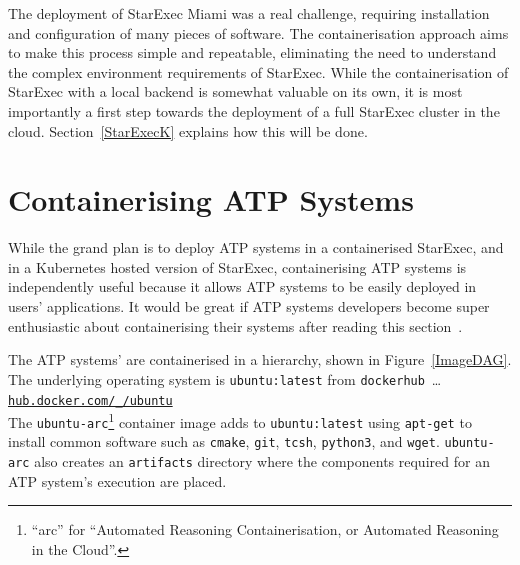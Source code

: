 \documentclass{easychair}
\newcommand{\dav}[1]{{\color{red}{David: {#1}}}}
\begin{document}
The deployment of StarExec Miami was a real challenge, requiring installation and configuration 
of many pieces of software.
The containerisation approach aims to make this process simple and repeatable, eliminating the 
need to understand the complex environment requirements of StarExec. 
While the containerisation of StarExec with a local backend is somewhat valuable on its own,
it is most importantly a first step towards the deployment of a full StarExec cluster in the cloud.
Section~\ref{StarExecK} explains how this will be done.


\section{Containerising ATP Systems}
\label{ContainerisingATPSystems}

While the grand plan is to deploy ATP systems in a containerised StarExec, and in a Kubernetes 
hosted version of StarExec, containerising ATP systems is independently useful because it allows 
ATP systems to be easily deployed in users' applications.
It would be great if ATP systems developers become super enthusiastic about containerising their 
systems after reading this section~\smiley.

The ATP systems' are containerised in a hierarchy, shown in Figure~\ref{ImageDAG}.
The underlying operating system is {\tt ubuntu:latest} from {\tt dockerhub}~\ldots\\
\hspace*{1cm}\href{https://hub.docker.com/_/ubuntu}{\tt hub.docker.com/\_/ubuntu} \\
The {\tt ubuntu-arc}\footnote{%
``arc'' for ``Automated Reasoning Containerisation, or Automated Reasoning in the Cloud''.}
container image adds to {\tt ubuntu:latest} using {\tt apt-get} to 
install common software such as {\tt cmake}, {\tt git}, {\tt tcsh}, {\tt python3}, and {\tt wget}.
{\tt ubuntu-arc} also creates an {\tt artifacts} directory where the components required for 
an ATP system's execution are placed.
\end{document}
